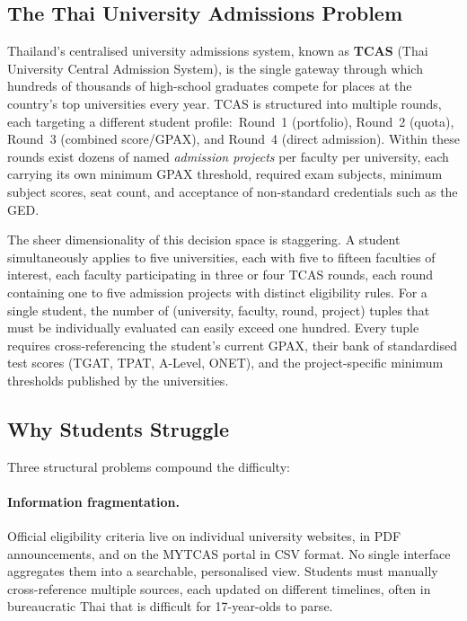 ﻿\documentclass[12pt,a4paper]{article}
\begin{document}
\subsection{The Thai University Admissions Problem}

Thailand's centralised university admissions system, known as \textbf{TCAS} (Thai
University Central Admission System), is the single gateway through which hundreds
of thousands of high-school graduates compete for places at the country's top
universities every year. TCAS is structured into multiple rounds, each targeting a
different student profile:\ Round~1 (portfolio), Round~2 (quota), Round~3 (combined
score/GPAX), and Round~4 (direct admission). Within these rounds exist dozens of
named \emph{admission projects} per faculty per university, each carrying its own
minimum GPAX threshold, required exam subjects, minimum subject scores, seat count,
and acceptance of non-standard credentials such as the GED.

The sheer dimensionality of this decision space is staggering. A student
simultaneously applies to five universities, each with five to fifteen faculties of
interest, each faculty participating in three or four TCAS rounds, each round
containing one to five admission projects with distinct eligibility rules. For a
single student, the number of (university, faculty, round, project) tuples that
must be individually evaluated can easily exceed one hundred. Every tuple requires
cross-referencing the student's current GPAX, their bank of standardised test
scores (TGAT, TPAT, A-Level, ONET), and the project-specific minimum thresholds
published by the universities.

\subsection{Why Students Struggle}

Three structural problems compound the difficulty:

\paragraph{Information fragmentation.} Official eligibility criteria live on
individual university websites, in PDF announcements, and on the MYTCAS portal in
CSV format. No single interface aggregates them into a searchable, personalised
view. Students must manually cross-reference multiple sources, each updated on
different timelines, often in bureaucratic Thai that is difficult for 17-year-olds
to parse.
\end{document}
